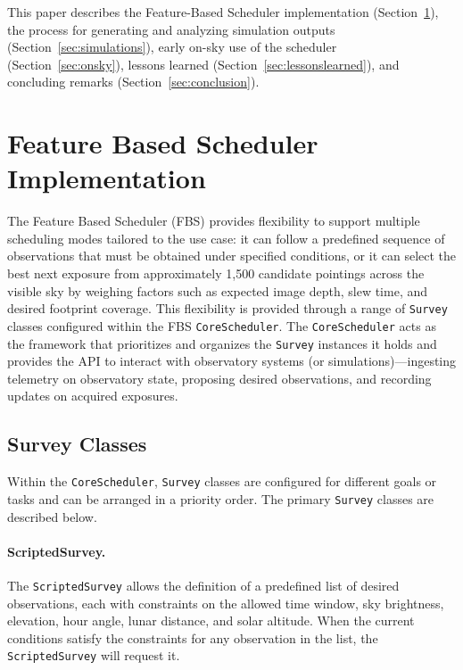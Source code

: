 This paper describes the Feature-Based Scheduler implementation
(Section~\ref{sec:implementation}), the process for generating and analyzing
simulation outputs (Section~\ref{sec:simulations}), early on-sky use of the
scheduler (Section~\ref{sec:onsky}), lessons learned
(Section~\ref{sec:lessonslearned}), and concluding remarks
(Section~\ref{sec:conclusion}).


\section{Feature Based Scheduler Implementation}
\label{sec:implementation}

The Feature Based Scheduler (FBS) provides flexibility to support multiple
scheduling modes tailored to the use case: it can follow a predefined sequence
of observations that must be obtained under specified conditions, or it can
select the best next exposure from approximately 1{,}500 candidate pointings
across the visible sky by weighing factors such as expected image depth, slew
time, and desired footprint coverage. This flexibility is provided through a
range of \texttt{Survey} classes configured within the FBS
\texttt{CoreScheduler}. The \texttt{CoreScheduler} acts as the framework that
prioritizes and organizes the \texttt{Survey} instances it holds and provides the
API to interact with observatory systems (or simulations)---ingesting telemetry
on observatory state, proposing desired observations, and recording updates on
acquired exposures.

\subsection{Survey Classes}
\label{sec:survey_classes}

Within the \texttt{CoreScheduler}, \texttt{Survey} classes are configured for
different goals or tasks and can be arranged in a priority order. The primary
\texttt{Survey} classes are described below.

\paragraph{ScriptedSurvey.}
The \texttt{ScriptedSurvey} allows the definition of a predefined list of
desired observations, each with constraints on the allowed time window, sky
brightness, elevation, hour angle, lunar distance, and solar altitude. When the
current conditions satisfy the constraints for any observation in the list, the
\texttt{ScriptedSurvey} will request it.

